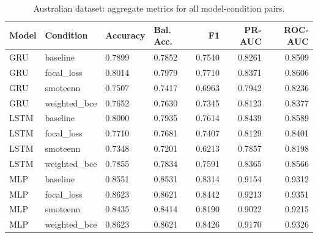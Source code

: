 \documentclass[11pt,a4paper]{article}
\begin{document}
\begin{table}[htbp]
\centering
\scriptsize
\caption{Australian dataset: aggregate metrics for all model-condition pairs.}
\label{tab:australian-all}
\begin{tabular}{llllrrr}
\toprule
Model & Condition & Accuracy & Bal. Acc. & F1 & PR-AUC & ROC-AUC \\
\midrule
GRU & baseline & 0.7899 & 0.7852 & 0.7540 & 0.8261 & 0.8509 \\
GRU & focal\_loss & 0.8014 & 0.7979 & 0.7710 & 0.8371 & 0.8606 \\
GRU & smoteenn & 0.7507 & 0.7417 & 0.6963 & 0.7942 & 0.8236 \\
GRU & weighted\_bce & 0.7652 & 0.7630 & 0.7345 & 0.8123 & 0.8377 \\
LSTM & baseline & 0.8000 & 0.7935 & 0.7614 & 0.8439 & 0.8589 \\
LSTM & focal\_loss & 0.7710 & 0.7681 & 0.7407 & 0.8129 & 0.8401 \\
LSTM & smoteenn & 0.7348 & 0.7201 & 0.6213 & 0.7857 & 0.8198 \\
LSTM & weighted\_bce & 0.7855 & 0.7834 & 0.7591 & 0.8365 & 0.8566 \\
MLP & baseline & 0.8551 & 0.8531 & 0.8314 & 0.9154 & 0.9312 \\
MLP & focal\_loss & 0.8623 & 0.8621 & 0.8442 & 0.9213 & 0.9351 \\
MLP & smoteenn & 0.8435 & 0.8414 & 0.8190 & 0.9022 & 0.9215 \\
MLP & weighted\_bce & 0.8623 & 0.8621 & 0.8426 & 0.9170 & 0.9326 \\
\bottomrule
\end{tabular}
\end{table}
\end{document}

